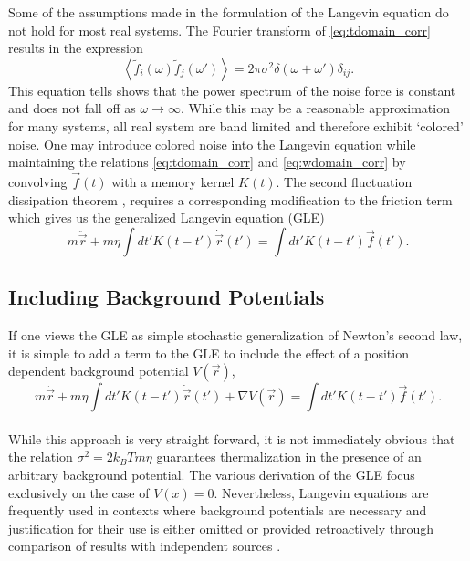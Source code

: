 Some of the assumptions made in the formulation of the Langevin equation do not hold for most real systems. The Fourier transform of \ref{eq:tdomain_corr} results in the expression
\begin{equation}
\left<\tilde{f}_i(\omega)\tilde{f}_j(\omega')\right>=2\pi\sigma^2\delta(\omega+\omega')\delta_{ij}. \label{eq:wdomain_corr}
\end{equation}
This equation tells shows that the power spectrum of the noise force is constant and does not fall off as $\omega \rightarrow \infty$. While this may be a reasonable approximation for many systems, all real system are band limited and therefore exhibit `colored' noise. One may introduce colored noise into the Langevin equation while maintaining the relations \ref{eq:tdomain_corr} and \ref{eq:wdomain_corr} by convolving $\vec{f}(t)$ with a memory kernel $K(t)$. The second fluctuation dissipation theorem \cite{Kubo}, requires a corresponding modification to the friction term which gives us the generalized Langevin equation (GLE)
\begin{equation}
m\ddot{\vec{r}} + m \eta \int dt' K\left(t-t'\right) \dot{\vec{r}}(t') = \int dt' K\left(t-t'\right) \vec{f}(t').
\end{equation}

\subsection{Including Background Potentials} \label{sec:gle_with_background}

If one views the GLE as simple stochastic generalization of Newton's second law, it is simple to add a term to the GLE to include the effect of a position dependent background potential $V(\vec{r})$,
\begin{equation}
m\ddot{\vec{r}} + m \eta \int dt' K\left(t-t'\right) \dot{\vec{r}}(t') + \nabla V\left(\vec{r}\right)= \int dt' K\left(t-t'\right) \vec{f}(t').
\end{equation}
\\
While this approach is very straight forward, it is not immediately obvious that the relation $\sigma^2 = 2k_BTm\eta$ guarantees thermalization in the presence of an arbitrary background potential. The various derivation of the GLE \cite{Kubo, Pathria, Tong} focus exclusively on the case of $V(x)=0$. Nevertheless, Langevin equations are frequently used in contexts where background potentials are necessary and justification for their use is either omitted or provided retroactively through comparison of results with independent sources \cite{Ward, Townsend, AVIDOR2019145}.  

